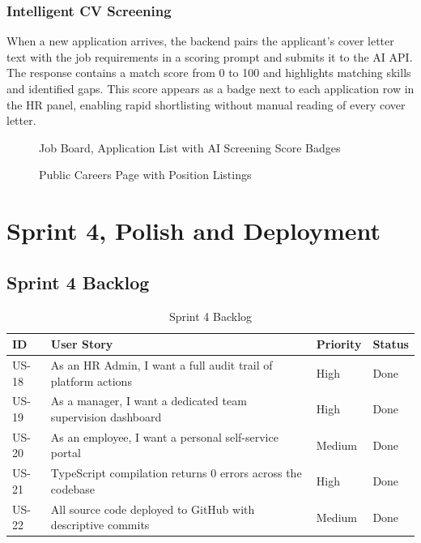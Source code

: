\documentclass[12pt,a4paper]{report}
\newcommand{\cmark}{\ding{51}}
\begin{document}
\subsubsection{Intelligent CV Screening}

When a new application arrives, the backend pairs the applicant's cover letter text with
the job requirements in a scoring prompt and submits it to the AI API. The response
contains a match score from 0 to 100 and highlights matching skills and identified gaps.
This score appears as a badge next to each application row in the HR panel, enabling
rapid shortlisting without manual reading of every cover letter.

\begin{figure}[H]
\centering
{}
\caption{Job Board, Application List with AI Screening Score Badges}
\label{fig:job_board}
\end{figure}

\begin{figure}[H]
\centering
{}
\caption{Public Careers Page with Position Listings}
\label{fig:careers}
\end{figure}

\section{Sprint 4, Polish and Deployment}

\subsection{Sprint 4 Backlog}

\begin{table}[H]
\centering
\caption{Sprint 4 Backlog}
\label{tab:s4_backlog}
\begin{tabular}{|C{1.2cm}|L{7cm}|C{2cm}|C{2.5cm}|}
\hline
{}
\textbf{ID} & \textbf{User Story} & \textbf{Priority} & \textbf{Status} \\
\hline
US-18 & As an HR Admin, I want a full audit trail of platform actions & High & \cmark Done \\
\hline
US-19 & As a manager, I want a dedicated team supervision dashboard & High & \cmark Done \\
\hline
US-20 & As an employee, I want a personal self-service portal & Medium & \cmark Done \\
\hline
US-21 & TypeScript compilation returns 0 errors across the codebase & High & \cmark Done \\
\hline
US-22 & All source code deployed to GitHub with descriptive commits & Medium & \cmark Done \\
\hline
\end{tabular}
\end{table}
\end{document}
